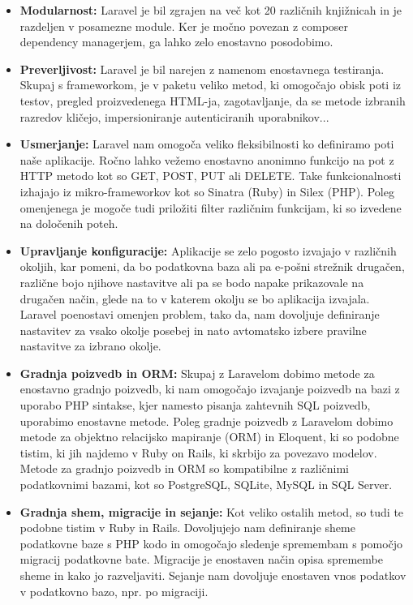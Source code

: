 \documentclass[12pt,a4paper,titlepage,openany]{report}
\begin{document}
\begin{itemize}
\item \textbf{Modularnost:} Laravel je bil zgrajen na več kot 20 različnih knjižnicah in je razdeljen v posamezne module. Ker je močno povezan z composer dependency managerjem, ga lahko zelo enostavno posodobimo.

\item \textbf{Preverljivost:}
Laravel je bil narejen z namenom enostavnega testiranja. Skupaj s frameworkom, je v paketu veliko metod, ki omogočajo obisk poti iz testov, pregled proizvedenega HTML-ja, zagotavljanje, da se metode izbranih razredov kličejo, impersioniranje autenticiranih uporabnikov...

\item \textbf{Usmerjanje:}
Laravel nam omogoča veliko fleksibilnosti ko definiramo poti naše aplikacije. Ročno lahko vežemo enostavno anonimno funkcijo na pot z HTTP metodo kot so GET, POST, PUT ali DELETE. Take funkcionalnosti izhajajo iz mikro-frameworkov kot so Sinatra (Ruby) in Silex (PHP). Poleg omenjenega je mogoče tudi priložiti filter različnim funkcijam, ki so izvedene na določenih poteh.

\item \textbf{Upravljanje konfiguracije:}
Aplikacije se zelo pogosto izvajajo v različnih okoljih, kar pomeni, da bo podatkovna baza ali pa e-pošni strežnik drugačen, različne bojo njihove nastavitve ali pa se bodo napake prikazovale na drugačen način, glede na to v katerem okolju se bo aplikacija izvajala. Laravel poenostavi omenjen problem, tako da, nam dovoljuje definiranje nastavitev za vsako okolje posebej in nato avtomatsko izbere pravilne nastavitve za izbrano okolje.

\item \textbf{Gradnja poizvedb in ORM:}
Skupaj z Laravelom dobimo metode za enostavno gradnjo poizvedb, ki nam omogočajo izvajanje poizvedb na bazi z uporabo PHP sintakse, kjer namesto pisanja zahtevnih SQL poizvedb, uporabimo enostavne metode. Poleg gradnje poizvedb z Laravelom dobimo metode za objektno relacijsko mapiranje (ORM) in Eloquent, ki so podobne tistim, ki jih najdemo v Ruby on Rails, ki skrbijo za povezavo modelov. Metode za gradnjo poizvedb in ORM so kompatibilne z različnimi podatkovnimi bazami, kot so PostgreSQL, SQLite, MySQL in SQL Server.

\item \textbf{Gradnja shem, migracije in sejanje:}
Kot veliko ostalih metod, so tudi te podobne tistim v Ruby in Rails. Dovoljujejo nam definiranje sheme podatkovne baze s PHP kodo in omogočajo sledenje spremembam s pomočjo migracij podatkovne bate. Migracije je enostaven način opisa spremembe sheme in kako jo razveljaviti. Sejanje nam dovoljuje enostaven vnos podatkov v podatkovno bazo, npr. po migraciji.


\end{itemize}
\end{document}
